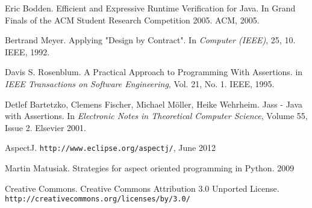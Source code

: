 \documentclass[a4paper,11pt]{article}
\begin{document}
\begin{thebibliography}{99}
	Eric Bodden.
	Efficient and Expressive Runtime Verification for Java.
	In Grand Finals of the ACM Student Research Competition 2005.
	ACM, 2005.

	Bertrand Meyer.
	Applying "Design by Contract".
	In \emph{Computer (IEEE)}, 25, 10.
	IEEE, 1992.
	
	Davis S. Rosenblum.
	A Practical Approach to Programming With Assertions.
	in \emph{IEEE Transactions on Software Engineering}, Vol. 21, No. 1.
	IEEE, 1995.

	Detlef Bartetzko, Clemens Fischer, Michael Möller, Heike Wehrheim.
	Jass - Java with Assertions.
	In \emph{Electronic Notes in Theoretical Computer Science}, Volume 55, Issue 2.
	Elsevier 2001.

	AspectJ.
	\texttt{http://www.eclipse.org/aspectj/},
	June 2012

	Martin Matusiak.
	Strategies for aspect oriented programming in Python.
	2009

	Creative Commons.
	Creative Commons Attribution 3.0 Unported License.
	\texttt{http://creativecommons.org/licenses/by/3.0/}

\end{thebibliography}
\end{document}
